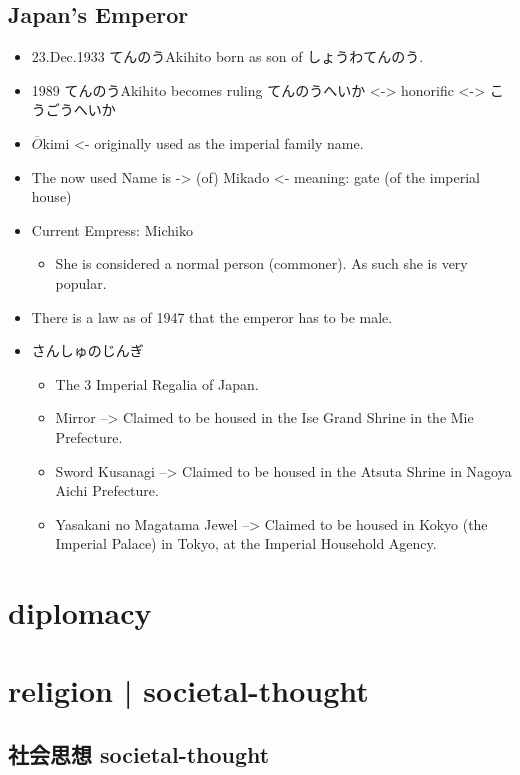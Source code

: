 \documentclass{article}
\newcommand\tabni[1][0.2cm]{\hspace*{#1}}
\begin{document}
\subsection{Japan's Emperor}
\begin{itemize}
    \item 23.Dec.1933 てんのうAkihito born as son of しょうわてんのう.
    \item 1989 てんのうAkihito becomes ruling てんのうへいか <-> honorific <-> こうごうへいか
    \item $\overline{O}$kimi <- originally used as the imperial family name.
    \item The now used Name is -> (of) Mikado <- meaning: gate (of the imperial house)
    \item Current Empress: Michiko
    \begin{itemize}
        \item She is considered a normal person (commoner). As such she is very popular.
    \end{itemize}
    \item There is a law as of 1947 that the emperor has to be male.
    \item さんしゅのじんぎ
    \begin{itemize}
        \item The 3 Imperial Regalia of Japan.
        \item Mirror --> Claimed to be housed in the Ise Grand Shrine in the Mie Prefecture.
        \item Sword Kusanagi --> Claimed to be housed in the Atsuta Shrine in Nagoya Aichi Prefecture.
        \item Yasakani no Magatama Jewel --> Claimed to be housed in Kokyo (the Imperial Palace) in Tokyo, at the Imperial Household Agency.
    \end{itemize}
\end{itemize}
\section{ \tabni diplomacy }
\section{ \tabni religion |  \tabni societal-thought }
\subsection{社会思想 \tabni societal-thought}
\end{document}
